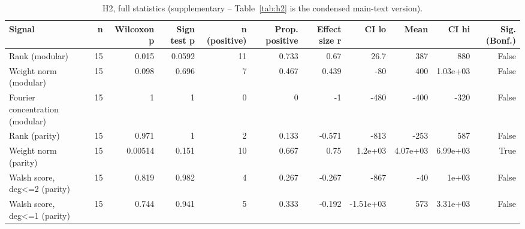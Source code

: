 \begin{table}
\caption{H2, full statistics (supplementary -- Table~\ref{tab:h2} is the condensed main-text version).}
\label{tab:h2full}
\begin{tabular}{lrrrrrrrrrr}
\toprule
Signal & n & Wilcoxon p & Sign test p & n (positive) & Prop. positive & Effect size r & CI lo & Mean & CI hi & Sig. (Bonf.) \\
\midrule
Rank (modular) & 15 & 0.015 & 0.0592 & 11 & 0.733 & 0.67 & 26.7 & 387 & 880 & False \\
Weight norm (modular) & 15 & 0.098 & 0.696 & 7 & 0.467 & 0.439 & -80 & 400 & 1.03e+03 & False \\
Fourier concentration (modular) & 15 & 1 & 1 & 0 & 0 & -1 & -480 & -400 & -320 & False \\
Rank (parity) & 15 & 0.971 & 1 & 2 & 0.133 & -0.571 & -813 & -253 & 587 & False \\
Weight norm (parity) & 15 & 0.00514 & 0.151 & 10 & 0.667 & 0.75 & 1.2e+03 & 4.07e+03 & 6.99e+03 & True \\
Walsh score, deg<=2 (parity) & 15 & 0.819 & 0.982 & 4 & 0.267 & -0.267 & -867 & -40 & 1e+03 & False \\
Walsh score, deg<=1 (parity) & 15 & 0.744 & 0.941 & 5 & 0.333 & -0.192 & -1.51e+03 & 573 & 3.31e+03 & False \\
\bottomrule
\end{tabular}
\end{table}
